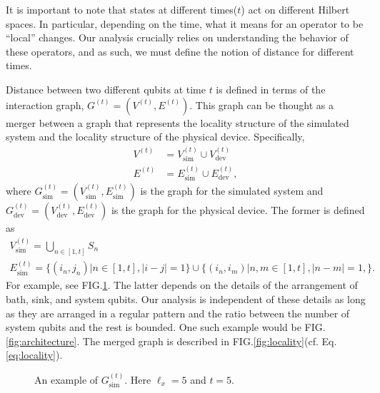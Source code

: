 \documentclass[prx,aps,amsmath,amssymb,floatfix,superscriptaddress,11pt,tightenlines,longbibliography,onecolumn,notitlepage]{revtex4-1}
\begin{document}
It is important to note that states at different times($t$) act on different Hilbert spaces. In particular, depending on the time, what it means for an operator to be ``local'' changes. Our analysis crucially relies on understanding the behavior of these operators, and as such, we must define the notion of distance for different times.

Distance between two different qubits at time $t$ is defined in terms of the interaction graph, $G^{(t)}=(V^{(t)}, E^{(t)})$. This graph can be thought as a merger between a graph that represents the locality structure of the simulated system and the locality structure of the physical device. Specifically,
\begin{equation}
  \label{eq:locality}
  \begin{aligned}
    V^{(t)} &= V_{\text{sim}}^{(t)} \cup V_{\text{dev}}^{(t)} \\
    E^{(t)} &= E_{\text{sim}}^{(t)} \cup E_{\text{dev}}^{(t)}, 
  \end{aligned}
\end{equation}
where $G_{\text{sim}}^{(t)} = (V_{\text{sim}}^{(t)}, E_{\text{sim}}^{(t)})$ is the graph for the simulated system and $G_{\text{dev}}^{(t)} =(V_{\text{dev}}^{(t)}, E_{\text{dev}}^{(t)}) $ is the graph for the physical device. The former is defined as
\begin{gather*}
    V_{\text{sim}}^{(t)} = \bigcup_{n\in [1,t]} S_n \\
    E_{\text{sim}}^{(t)} = \{(i_n,j_n)| n\in [1,t], |i-j|=1 \} \cup \{(i_n,i_m)| n,m\in [1,t], |n-m|=1,  \}.
  \end{gather*}
For example, see FIG.\ref{fig:locality_sim}. The latter depends on the details of the arrangement of bath, sink, and system qubits. Our analysis is independent of these details as long as they are arranged in a regular pattern and the ratio between the number of system qubits and the rest is bounded. One such example would be FIG.\ref{fig:architecture}. The merged graph is described in FIG.\ref{fig:locality}(cf. Eq.\ref{eq:locality}).
\begin{figure}[h]
  \caption{An example of $G_{\text{sim}}^{(t)}$. Here $\ell_x=5$ and $t=5$.  \label{fig:locality_sim}}
\end{figure}
\end{document}
